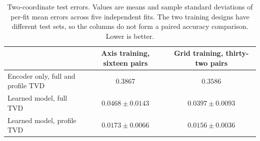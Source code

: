 \begin{table}[!t]
\caption{Two-coordinate test errors.
Values are means and sample standard deviations of per-fit mean errors
across five independent fits. The two training designs
have different test sets, so the columns do not form a paired accuracy
comparison. Lower is better.}
\label{tab:gaussian-two-dimensional}
\centering
\begin{tabular}{lcc}\toprule
 & Axis training, sixteen pairs & Grid training, thirty-two pairs\\\midrule
Encoder only, full and profile TVD & $0.3867$ & $0.3586$\\
Learned model, full TVD & $0.0468\pm0.0143$ & $0.0397\pm0.0093$\\
Learned model, profile TVD & $0.0173\pm0.0066$ & $0.0156\pm0.0036$\\
\bottomrule\end{tabular}
\end{table}
